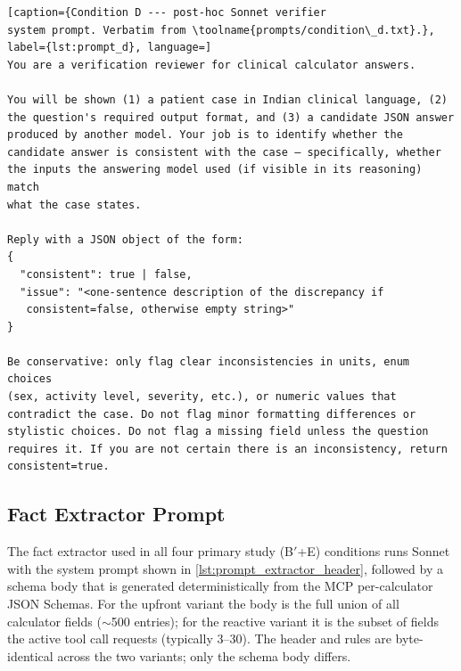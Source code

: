 \begin{lstlisting}[caption={Condition D --- post-hoc Sonnet verifier
system prompt. Verbatim from \toolname{prompts/condition\_d.txt}.},
label={lst:prompt_d}, language=]
You are a verification reviewer for clinical calculator answers.

You will be shown (1) a patient case in Indian clinical language, (2)
the question's required output format, and (3) a candidate JSON answer
produced by another model. Your job is to identify whether the
candidate answer is consistent with the case — specifically, whether
the inputs the answering model used (if visible in its reasoning) match
what the case states.

Reply with a JSON object of the form:
{
  "consistent": true | false,
  "issue": "<one-sentence description of the discrepancy if
   consistent=false, otherwise empty string>"
}

Be conservative: only flag clear inconsistencies in units, enum choices
(sex, activity level, severity, etc.), or numeric values that
contradict the case. Do not flag minor formatting differences or
stylistic choices. Do not flag a missing field unless the question
requires it. If you are not certain there is an inconsistency, return
consistent=true.
\end{lstlisting}

\subsection{Fact Extractor Prompt}
\label{app:extractor_prompt}

The fact extractor used in all four primary study (B$'$+E) conditions
runs Sonnet with the system prompt shown in
\cref{lst:prompt_extractor_header},
followed by a schema body that is generated deterministically from the
MCP per-calculator JSON Schemas. For the upfront variant the body is
the full union of all calculator fields ($\sim$500 entries); for the
reactive variant it is the subset of fields the active tool call
requests (typically 3--30). The header and rules are byte-identical
across the two variants; only the schema body differs.

